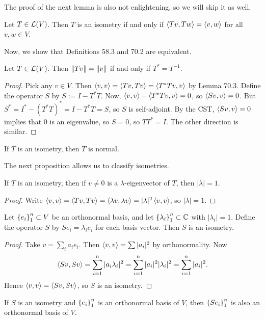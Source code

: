 \documentclass{article}
\begin{document}
The proof of the next lemma is also not enlightening, so we will skip it as well.
\begin{lemma}
Let $T\in\mathcal L(V)$. Then $T$ is an isometry if and only if $\left\langle Tv, Tw\right\rangle = \left\langle v, w\right\rangle$ for all $v,w\in V$.
\end{lemma}

Now, we show that Definitions 58.3 and 70.2 are equivalent.
\begin{proposition}
Let $T\in\mathcal L(V)$. Then $\left\Vert Tv\right\Vert = \left\Vert v\right\Vert$ if and only if $T^* = T^{-1}$.
\end{proposition}
\begin{proof}
Pick any $v\in V$. Then $\left\langle v,v\right\rangle = \left\langle Tv, Tv\right\rangle = \left\langle T^*Tv, v\right\rangle$ by Lemma 70.3. Define the operator $S$ by $S := I - T^*T$. Now, $\left\langle v,v\right\rangle - \left\langle T^*Tv,v\right\rangle = 0$, so $\left\langle Sv, v\right\rangle = 0$. But $S^* = I^* - (T^*T)^* = I - T^*T=S$, so $S$ is self-adjoint. By the CST, $\left\langle Sv,v\right\rangle=0$ implies that $0$ is an eigenvalue, so $S=0$, so $TT^* = I$. The other direction is similar.
\end{proof}
\begin{corollary}
If $T$ is an isometry, then $T$ is normal.
\end{corollary}

The next proposition allows us to classify isometries.
\begin{proposition}
If $T$ is an isometry, then if $v\neq 0$ is a $\lambda$-eigenvector of $T$, then $|\lambda| = 1$.
\end{proposition}
\begin{proof}
Write $\left\langle v,v\right\rangle = \left\langle Tv, Tv\right\rangle = \left\langle\lambda v,\lambda v\right\rangle = |\lambda|^2\left\langle v,v\right\rangle$, so $|\lambda| = 1$.
\end{proof}
\begin{theorem}
Let $\left\{e_i\right\}_1^n\subset V$ be an orthonormal basis, and let $\left\{\lambda_i\right\}_1^n\subset \mathbb C$ with $|\lambda_i| = 1$. Define the operator $S$ by $Se_i = \lambda_ie_i$ for each basis vector. Then $S$ is an isometry.
\end{theorem}
\begin{proof}
Take $v = \sum_i a_ie_i$. Then $\left\langle v,v\right\rangle = \sum |a_i|^2$ by orthonormality. Now
$$\left\langle Sv, Sv\right\rangle = \sum_{i=1}^n |a_i\lambda_i|^2 = \sum_{i=1}^n |a_i|^2|\lambda_i|^2 = \sum_{i=1}^n |a_i|^2.$$
Hence $\left\langle v, v\right\rangle = \left\langle Sv, Sv\right\rangle$, so $S$ is an isometry.
\end{proof}
\begin{corollary}
If $S$ is an isometry and $\left\{e_i\right\}_1^n$ is an orthonormal basis of $V$, then $\left\{Se_i\right\}_1^n$ is also an orthonormal basis of $V$.
\end{corollary}
\end{document}
